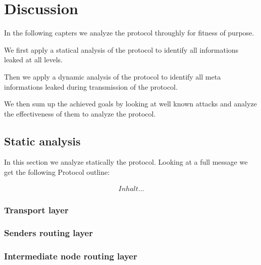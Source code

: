 
\part{Discussion \label{sec:discussion}}
In the following capters we analyze the protocol throughly for fitness of purpose. 

We first apply a statical analysis of the protocol to identify all informations leaked at all levels.

Then we apply a dynamic analysis of the protocol to identify all meta informations leaked during transmission of the protocol.

We then sum up the achieved goals by looking at well known attacks and analyze the effectiveness of them to analyze the protocol.

\chapter{Static analysis}
In this section we analyze statically the protocol. Looking at a full message we get the following Protocol outline:

\begin{eqnarray}
Inhalt...
\end{eqnarray}
\section{Transport layer}

\section{Senders routing layer}

\section{Intermediate node routing layer}

